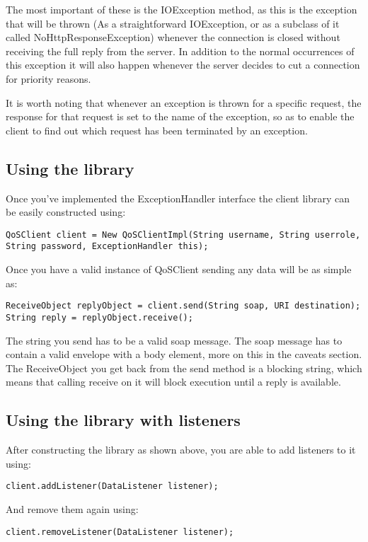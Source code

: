 The most important of these is the IOException method, as this is the exception that will be thrown (As a straightforward IOException, or as a subclass of it called NoHttpResponseException) whenever the connection is closed without receiving the full reply from the server. In addition to the normal occurrences of this exception it will also happen whenever the server decides to cut a connection for priority reasons.

It is worth noting that whenever an exception is thrown for a specific request, the response for that request is set to the name of the exception, so as to enable the client to find out which request has been terminated by an exception.

\subsection{Using the library}\label{userguideUsingLibrary}
Once you’ve implemented the ExceptionHandler interface the client library can be easily constructed using:

\begin{lstlisting}[caption={Constructing the library}, label=userguideConstruction]
QoSClient client = New QoSClientImpl(String username, String userrole, String password, ExceptionHandler this);
\end{lstlisting}

Once you have a valid instance of QoSClient sending any data will be as simple as:

\begin{lstlisting}[caption={Sending data}, label=userguideSenddata]
ReceiveObject replyObject = client.send(String soap, URI destination);
String reply = replyObject.receive();
\end{lstlisting}

The string you send has to be a valid soap message. The soap message has to contain a valid envelope with a body element, more on this in the caveats section.
The ReceiveObject you get back from the send method is a blocking string, which means that calling receive on it will block execution until a reply is available.

\subsection{Using the library with listeners}\label{userguideUsingLibraryWithListeners}
After constructing the library as shown above, you are able to add listeners to it using:
\begin{lstlisting}[caption={Add listener}, label=userguideAddlistener]
    client.addListener(DataListener listener);
\end{lstlisting}
And remove them again using:
\begin{lstlisting}[caption={Remove listener}, label=userguideRemovelistener]
    client.removeListener(DataListener listener);
\end{lstlisting}

